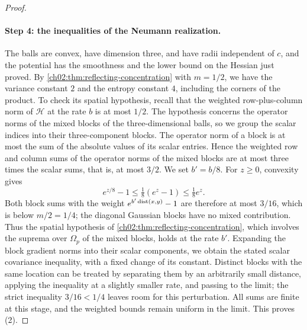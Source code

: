 \begin{proof}
\paragraph{Step 4: the inequalities of the Neumann realization.}
The balls are convex, have dimension three, and have radii independent of $c$, and the potential has the smoothness and the lower bound on the Hessian just proved. By \cref{ch02:thm:reflecting-concentration} with $m=1/2$, we have the variance constant $2$ and the entropy constant $4$, including the corners of the product. To check its spatial hypothesis, recall that the weighted row-plus-column norm of $\mathcal H$ at the rate $b$ is at most $1/2$. The hypothesis concerns the operator norms of the mixed blocks of the three-dimensional balls, so we group the scalar indices into their three-component blocks. The operator norm of a block is at most the sum of the absolute values of its scalar entries. Hence the weighted row and column sums of the operator norms of the mixed blocks are at most three times the scalar sums, that is, at most $3/2$. We set $b'=b/8$. For $z\ge0$, convexity gives
\[
 e^{z/8}-1\le\tfrac18(e^z-1)\le\tfrac18e^z.
\]
Both block sums with the weight $e^{b'\operatorname{dist}(x,y)}-1$ are therefore at most $3/16$, which is below $m/2=1/4$; the diagonal Gaussian blocks have no mixed contribution. Thus the spatial hypothesis of \cref{ch02:thm:reflecting-concentration}, which involves the suprema over $\Omega_p$ of the mixed blocks, holds at the rate $b'$. Expanding the block gradient norms into their scalar components, we obtain the stated scalar covariance inequality, with a fixed change of its constant. Distinct blocks with the same location can be treated by separating them by an arbitrarily small distance, applying the inequality at a slightly smaller rate, and passing to the limit; the strict inequality $3/16<1/4$ leaves room for this perturbation. All sums are finite at this stage, and the weighted bounds remain uniform in the limit. This proves (2).


\end{proof}
